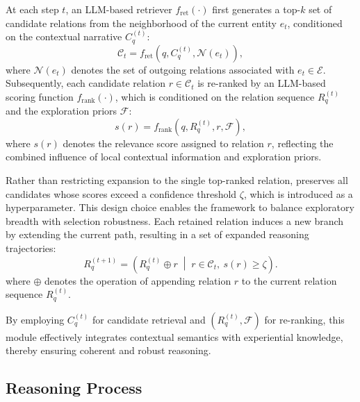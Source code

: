 At each step $t$, an LLM-based retriever $f_{\text{ret}}(\cdot)$ first generates a top-$k$ set of candidate relations from the neighborhood of the current entity $e_t$, conditioned on the contextual narrative $C_q^{(t)}$:
\begin{equation}
\mathcal{C}_t = f_{\text{ret}}(q, C_q^{(t)}, \mathcal{N}(e_t)),
\end{equation}
where $\mathcal{N}(e_t)$ denotes the set of outgoing relations associated with $e_t \in \mathcal{E}$.  
Subsequently, each candidate relation $r \in \mathcal{C}_t$ is re-ranked by an LLM-based scoring function $f_{\text{rank}}(\cdot)$, which is conditioned on the relation sequence $R_q^{(t)}$ and the exploration priors $\mathcal{F}$:
\begin{equation}
s(r) = f_{\text{rank}}(q, R_q^{(t)}, r, \mathcal{F}),
\end{equation}
where $s(r)$ denotes the relevance score assigned to relation $r$, reflecting the combined influence of local contextual information and exploration priors. 

Rather than restricting expansion to the single top-ranked relation, \method{} preserves all candidates whose scores exceed a confidence threshold $\zeta$, which is introduced as a hyperparameter. This design choice enables the framework to balance exploratory breadth with selection robustness. Each retained relation induces a new branch by extending the current path, resulting in a set of expanded reasoning trajectories:
\begin{equation}
R_q^{(t+1)} =
\left ( R_q^{(t)} \oplus r \;\middle|\; r \in \mathcal{C}_t,\ s(r) \geq \zeta \right ).
\end{equation}
where $\oplus$ denotes the operation of appending relation $r$ to the current relation sequence $R_q^{(t)}$.

By employing $C_q^{(t)}$ for candidate retrieval and $(R_q^{(t)}, \mathcal{F})$ for re-ranking, this module effectively integrates contextual semantics with experiential knowledge, thereby ensuring coherent and robust reasoning.


\subsection{Reasoning Process}

